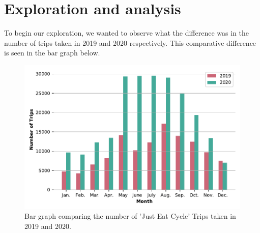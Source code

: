 \documentclass[11pt,a4paper]{article}
\begin{document}
\section{Exploration and  analysis} \label{exploration}
To begin our exploration, we wanted to observe what the difference was in the number of trips taken in 2019 and 2020 respectively. This comparative difference is seen in the bar graph below.

\begin{figure}[ht]
  \includegraphics{number_trips.pdf}
  \caption{Bar graph comparing the number of 'Just Eat Cycle' Trips taken in 2019 and 2020.}
  \label{fds-project:fig:numberOfTrips}
\end{figure}
\end{document}
